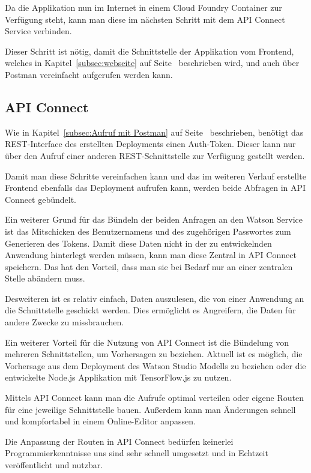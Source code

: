 Da die Applikation nun im Internet in einem Cloud Foundry Container zur Verfügung steht, kann man diese im nächsten
Schritt mit dem API Connect Service verbinden.

Dieser Schritt ist nötig, damit die Schnittstelle der Applikation vom Frontend, welches in Kapitel~\ref{subsec:webseite}
auf Seite~\pageref{subsec:webseite} beschrieben wird, und auch über Postman vereinfacht aufgerufen werden kann.

\subsection{API Connect}
\label{subsec:apiconnect}
Wie in Kapitel~\ref{subsec:Aufruf mit Postman} auf Seite~\pageref{subsec:Aufruf mit Postman} beschrieben, benötigt das
REST-Interface des erstellten Deployments einen Auth-Token. Dieser kann nur über den Aufruf einer anderen
REST-Schnittstelle zur Verfügung gestellt werden.

Damit man diese Schritte vereinfachen kann und das im weiteren Verlauf erstellte Frontend ebenfalls das Deployment
aufrufen kann, werden beide Abfragen in API Connect gebündelt.

Ein weiterer Grund für das Bündeln der beiden Anfragen an den Watson Service ist das Mitschicken des Benutzernamens und
des zugehörigen Passwortes zum Generieren des Tokens. Damit diese Daten nicht in der zu entwickelnden Anwendung
hinterlegt werden müssen, kann man diese Zentral in API Connect speichern. Das hat den Vorteil, dass man sie bei Bedarf
nur an einer zentralen Stelle abändern muss.

Desweiteren ist es relativ einfach, Daten auszulesen, die von einer Anwendung an die Schnittstelle geschickt werden.
Dies ermöglicht es Angreifern, die Daten für andere Zwecke zu missbrauchen.

Ein weiterer Vorteil für die Nutzung von API Connect ist die Bündelung von mehreren Schnittstellen, um Vorhersagen zu
beziehen. Aktuell ist es möglich, die Vorhersage aus dem Deployment des Watson Studio Modells zu beziehen oder die
entwickelte Node.js Applikation mit TensorFlow.js zu nutzen.

Mittels API Connect kann man die Aufrufe optimal verteilen oder eigene Routen für eine jeweilige Schnittstelle bauen.
Außerdem kann man Änderungen schnell und kompfortabel in einem Online-Editor anpassen.

Die Anpassung der Routen in API Connect bedürfen keinerlei Programmierkenntnisse uns sind sehr schnell umgesetzt und in
Echtzeit veröffentlicht und nutzbar.

